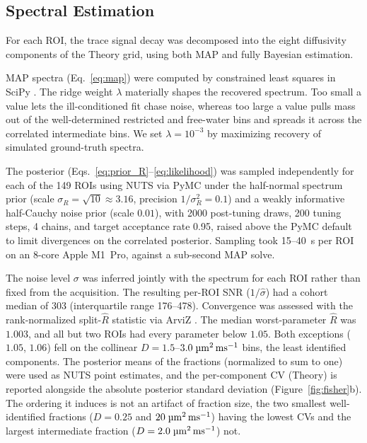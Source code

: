 \subsection{Spectral Estimation}

For each ROI, the trace signal decay was decomposed into the eight diffusivity components of the Theory grid, using both MAP and fully Bayesian estimation.

MAP spectra (Eq.~\ref{eq:map}) were computed by constrained least squares in SciPy \citep{virtanen2020scipy}.
The ridge weight $\lambda$ materially shapes the recovered spectrum. Too small a value lets the ill-conditioned fit chase noise, whereas too large a value pulls mass out of the well-determined restricted and free-water bins and spreads it across the correlated intermediate bins. We set $\lambda = 10^{-3}$ by maximizing recovery of simulated ground-truth spectra.

The posterior (Eqs.~\ref{eq:prior_R}--\ref{eq:likelihood}) was sampled independently for each of the 149 ROIs using NUTS via PyMC \citep{abrilpla2023pymc} under the half-normal spectrum prior (scale $\sigma_R = \sqrt{10} \approx 3.16$, precision $1/\sigma_R^2 = 0.1$) and a weakly informative half-Cauchy noise prior (scale $0.01$), with 2000 post-tuning draws, 200 tuning steps, 4 chains, and target acceptance rate 0.95, raised above the PyMC default to limit divergences on the correlated posterior. Sampling took 15--40~s per ROI on an 8-core Apple M1~Pro, against a sub-second MAP solve.

The noise level $\sigma$ was inferred jointly with the spectrum for each ROI rather than fixed from the acquisition. The resulting per-ROI SNR ($1/\hat{\sigma}$) had a cohort median of 303 (interquartile range 176--478).
Convergence was assessed with the rank-normalized split-$\hat{R}$ statistic \citep{vehtari2021rank} via ArviZ \citep{kumar2019arviz}. The median worst-parameter $\hat{R}$ was $1.003$, and all but two ROIs had every parameter below $1.05$. Both exceptions ($1.05$, $1.06$) fell on the collinear $D = 1.5$--$3.0\;\si{\micro\meter\squared\per\milli\second}$ bins, the least identified components. The posterior means of the fractions (normalized to sum to one) were used as NUTS point estimates, and the per-component CV (Theory) is reported alongside the absolute posterior standard deviation (Figure~\ref{fig:fisher}b). The ordering it induces is not an artifact of fraction size, the two smallest well-identified fractions ($D = 0.25$ and $20\;\si{\micro\meter\squared\per\milli\second}$) having the lowest CVs and the largest intermediate fraction ($D = 2.0\;\si{\micro\meter\squared\per\milli\second}$) not.

